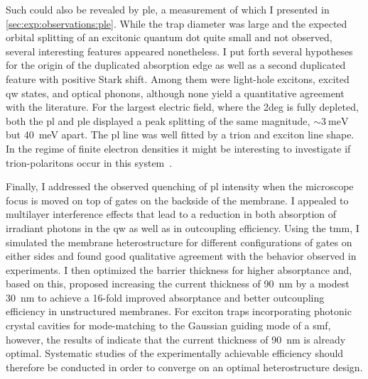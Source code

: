Such could also be revealed by \acrfull{ple}, a measurement of which I presented in \cref{sec:exp:observations:ple}.
While the trap diameter was large and the expected orbital splitting of an excitonic quantum dot quite small and not observed, several interesting features appeared nonetheless.
I put forth several hypotheses for the origin of the duplicated absorption edge as well as a second duplicated feature with positive Stark shift.
Among them were light-hole excitons, excited \gls{qw} states, and optical phonons, although none yield a quantitative agreement with the literature.
For the largest electric field, where the \gls{2deg} is fully depleted, both the \gls{pl} and \gls{ple} displayed a peak splitting of the same magnitude, $\sim\qty{3}{\milli\electronvolt}$ but \qty{40}{\milli\electronvolt} apart.
The \gls{pl} line was well fitted by a trion and exciton line shape.
In the regime of finite electron densities it might be interesting to investigate if trion-polaritons occur in this system~\cite{Baeten2015,Glazov2020,Huang2023b}.

Finally, I addressed the observed quenching of \gls{pl} intensity when the microscope focus is moved on top of gates on the backside of the membrane.
I appealed to multilayer interference effects that lead to a reduction in both absorption of irradiant photons in the \gls{qw} as well as in outcoupling efficiency.
Using the \acrfull{tmm}, I simulated the membrane heterostructure for different configurations of gates on either sides and found good qualitative agreement with the behavior observed in experiments.
I then optimized the  barrier thickness for higher absorptance and, based on this, proposed increasing the current thickness of \qty{90}{\nano\meter} by a modest \qty{30}{\nano\meter} to achieve a \num{16}-fold improved absorptance and better outcoupling efficiency in unstructured membranes.
For exciton traps incorporating photonic crystal cavities for mode-matching to the Gaussian guiding mode of a \gls{smf}, however, the results of \citet{Wu2022} indicate that the current thickness of \qty{90}{\nano\meter} is already optimal.
Systematic studies of the experimentally achievable efficiency should therefore be conducted in order to converge on an optimal heterostructure design.

